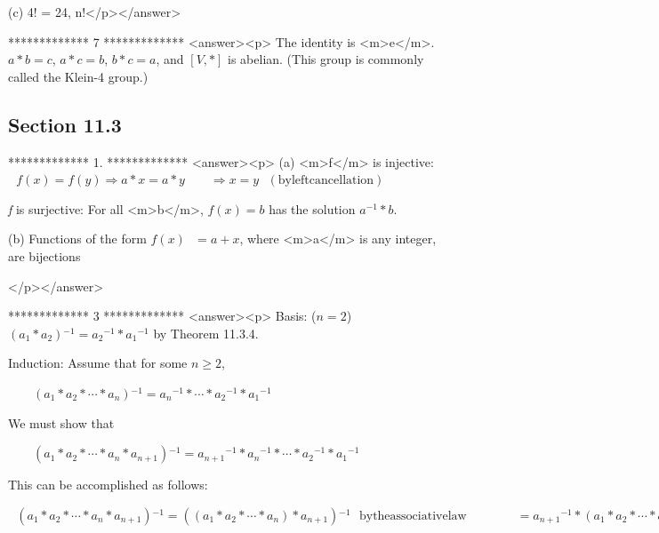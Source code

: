  (c) 4! = 24, n!</p></answer>


*************
7
*************
<answer><p>  The identity is <m>e</m>.   \(a*b = c\), \(a*c= b\),  \(b*c = a\), and \([V, *]\) is abelian. (This group is commonly called the Klein-4
group.)


\subsection{Section 11.3}

*************
1.
*************
<answer><p> (a)  <m>f</m> is injective: \(\text{       }f(x) = f(y) \Rightarrow  a * x = a * y \quad \quad \Rightarrow  x = y\text{      }(\text{by}
\text{left} \text{cancellation})\)



         \textit{ f }is surjective:  For all <m>b</m>,   \(f(x) = b\) has the solution \(a^{-1}*b\).



    (b) Functions of the form \(f(x)\text{  }= a + x\), where <m>a</m> is any integer, are bijections

</p></answer>


*************
3
*************
<answer><p>  Basis: (\(n = 2\))   \(\left(a_1*a_2\right){}^{-1}= a_2{}^{-1}*a_1{}^{-1}\) by Theorem 11.3.4.



Induction: Assume that for some \(n \geq  2\),



$\quad \quad $\(\left(a_1*a_2*\cdots *a_n\right){}^{-1}=a_n{}^{-1}*\cdots * a_2{}^{-1}*a_1{}^{-1}\)



We must show that



$\quad \quad $\(\left(a_1*a_2*\cdots *a_n*a_{n+1}\right){}^{-1}=a_{n+1}{}^{-1}*a_n{}^{-1}*\cdots * a_2{}^{-1}*a_1{}^{-1}\)



This can be accomplished as follows:



\(\text{            }\left(a_1*a_2*\cdots *a_n*a_{n+1}\right){}^{-1}=\left(\left(a_1*a_2*\cdots *a_n\right)*a_{n+1}\right){}^{-1}\text{ 
 }\text{by} \text{the} \text{associative} \text{law}\quad \quad \quad \quad =a_{n+1}{}^{-1}*\left(a_1*a_2*\cdots *a_n\right){}^{-1}\text{   }\text{by}
\text{the} \text{basis}\quad \quad \quad \quad =a_{n+1}{}^{-1}*\left(a_n{}^{-1}*\cdots * a_2{}^{-1}*a_1{}^{-1}\right)\text{  }\text{by} \text{the}
\text{induction} \text{hypothesis}\quad \quad \quad \quad = a_{n+1}{}^{-1}*a_n{}^{-1}*\cdots * a_2{}^{-1}*a_1{}^{-1} \text{by} \text{the} \text{associative}
\text{law}\text{   }\blacksquare\)

